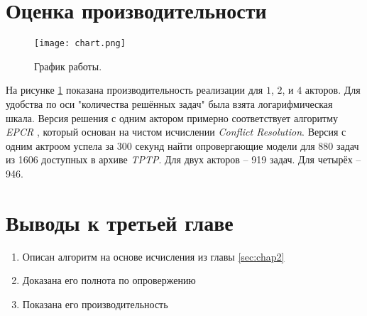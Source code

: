 \section{Оценка производительности}
\begin{figure}[!h]
\centering
\texttt{[image: chart.png]}
\caption{График работы.}\label{fig:chart}
\end{figure}

На рисунке \ref{fig:chart} показана производительность реализации для $1$, $2$, и $4$ акторов. Для удобства по оси "количества решённых задач" была взята логарифмическая шкала. Версия решения с одним актором примерно соответствует алгоритму \emph{EPCR} \cite{DBLP:journals/corr/ItegulovSP17}, который основан на чистом исчислении \emph{Conflict Resolution}. Версия с одним актроом успела за 300 секунд найти опровергающие модели для 880 задач из 1606 доступных в архиве \emph{TPTP}. Для двух акторов -- 919 задач. Для четырёх -- 946.

\section{Выводы к третьей главе}
\begin{enumerate}
	\item Описан алгоритм на основе исчисления из главы \ref{sec:chap2}
    \item Доказана его полнота по опровержению
    \item Показана его производительность
\end{enumerate}